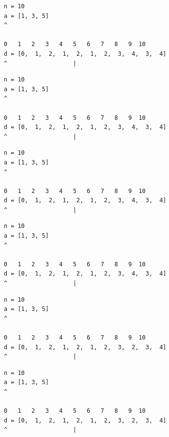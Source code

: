 \begin{frame}[fragile]
\begin{verbatim}
n = 10
a = [1, 3, 5]
^

0   1   2   3   4   5   6   7   8   9  10
d = [0,  1,  2,  1,  2,  1,  2,  3,  4,  3,  4]
^                   |
\end{verbatim}
\end{frame}
\addtocounter{framenumber}{-1}

\begin{frame}[fragile]
\begin{verbatim}
n = 10
a = [1, 3, 5]
^

0   1   2   3   4   5   6   7   8   9  10
d = [0,  1,  2,  1,  2,  1,  2,  3,  4,  3,  4]
^                   |
\end{verbatim}
\end{frame}
\addtocounter{framenumber}{-1}

\begin{frame}[fragile]
\begin{verbatim}
n = 10
a = [1, 3, 5]
^

0   1   2   3   4   5   6   7   8   9  10
d = [0,  1,  2,  1,  2,  1,  2,  3,  4,  3,  4]
^                   |
\end{verbatim}
\end{frame}
\addtocounter{framenumber}{-1}

\begin{frame}[fragile]
\begin{verbatim}
n = 10
a = [1, 3, 5]
^

0   1   2   3   4   5   6   7   8   9  10
d = [0,  1,  2,  1,  2,  1,  2,  3,  4,  3,  4]
^                   |
\end{verbatim}
\end{frame}
\addtocounter{framenumber}{-1}

\begin{frame}[fragile]
\begin{verbatim}
n = 10
a = [1, 3, 5]
^

0   1   2   3   4   5   6   7   8   9  10
d = [0,  1,  2,  1,  2,  1,  2,  3,  2,  3,  4]
^                   |
\end{verbatim}
\end{frame}
\addtocounter{framenumber}{-1}

\begin{frame}[fragile]
\begin{verbatim}
n = 10
a = [1, 3, 5]
^

0   1   2   3   4   5   6   7   8   9  10
d = [0,  1,  2,  1,  2,  1,  2,  3,  2,  3,  4]
^                   |
\end{verbatim}
\end{frame}
\addtocounter{framenumber}{-1}

